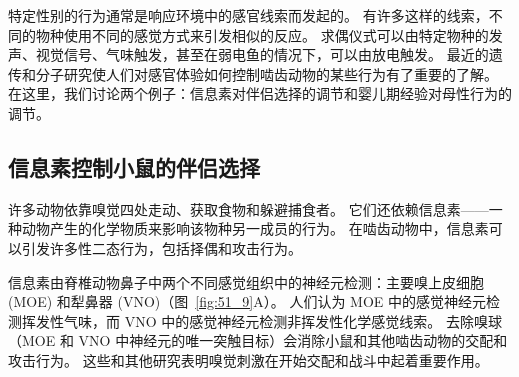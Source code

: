 特定性别的行为通常是响应环境中的感官线索而发起的。 有许多这样的线索，不同的物种使用不同的感觉方式来引发相似的反应。
求偶仪式可以由特定物种的发声、视觉信号、气味触发，甚至在弱电鱼的情况下，可以由放电触发。
最近的遗传和分子研究使人们对感官体验如何控制啮齿动物的某些行为有了重要的了解。
在这里，我们讨论两个例子：信息素对伴侣选择的调节和婴儿期经验对母性行为的调节。



\subsection{信息素控制小鼠的伴侣选择}
许多动物依靠嗅觉四处走动、获取食物和躲避捕食者。
它们还依赖信息素——一种动物产生的化学物质来影响该物种另一成员的行为。
在啮齿动物中，信息素可以引发许多性二态行为，包括择偶和攻击行为。


信息素由脊椎动物鼻子中两个不同感觉组织中的神经元检测：主要嗅上皮细胞 (MOE) 和犁鼻器 (VNO)（图~\ref{fig:51_9}A）。
人们认为 MOE 中的感觉神经元检测挥发性气味，而 VNO 中的感觉神经元检测非挥发性化学感觉线索。
去除嗅球（MOE 和 VNO 中神经元的唯一突触目标）会消除小鼠和其他啮齿动物的交配和攻击行为。
这些和其他研究表明嗅觉刺激在开始交配和战斗中起着重要作用。



